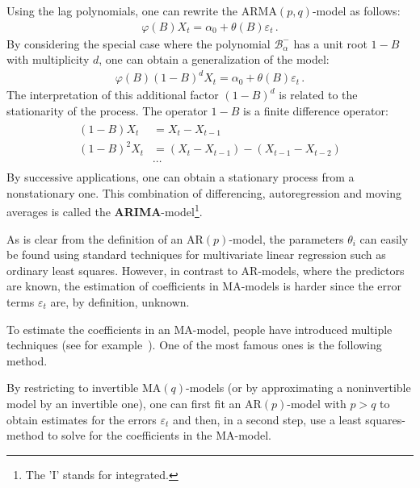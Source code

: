     Using the lag polynomials, one can rewrite the $\mathrm{ARMA}(p,q)$-model as follows:
    \begin{gather}
        \varphi(B)X_t = \alpha_0 + \theta(B)\varepsilon_t\,.
    \end{gather}
    By considering the special case where the polynomial $\mathcal{B}^-_\alpha$ has a unit root $1-B$ with multiplicity $d$, one can obtain a generalization of the model:
    \begin{gather}
        \varphi(B)(1-B)^dX_t = \alpha_0 + \theta(B)\varepsilon_t\,.
    \end{gather}
    The interpretation of this additional factor $(1-B)^d$ is related to the stationarity of the process. The operator $1-B$ is a finite difference operator:
    \begin{gather}
        \begin{aligned}
            (1-B)X_t &= X_t - X_{t-1}\\
            (1-B)^2X_t &= (X_t-X_{t-1}) - (X_{t-1}-X_{t-2})\\
            &\cdots
        \end{aligned}
    \end{gather}
    By successive applications, one can obtain a stationary process from a nonstationary one. This combination of differencing, autoregression and moving averages is called the \textbf{ARIMA}-model\footnote{The 'I' stands for integrated.}.


    \begin{remark}
        As is clear from the definition of an $\mathrm{AR}(p)$-model, the parameters $\theta_i$ can easily be found using standard techniques for multivariate linear regression such as ordinary least squares. However, in contrast to AR-models, where the predictors are known, the estimation of coefficients in MA-models is harder since the error terms $\varepsilon_t$ are, by definition, unknown.
    \end{remark}

    To estimate the coefficients in an MA-model, people have introduced multiple techniques (see for example~\citet{sandgren_moving_2006}). One of the most famous ones is the following method.
    \begin{method}[Durbin]
        By restricting to invertible $\mathrm{MA}(q)$-models (or by approximating a noninvertible model by an invertible one), one can first fit an $\mathrm{AR}(p)$-model with $p>q$ to obtain estimates for the errors $\varepsilon_t$ and then, in a second step, use a least squares-method to solve for the coefficients in the MA-model.
    \end{method}

